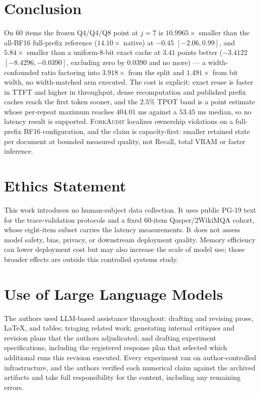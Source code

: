 \documentclass{article}
\newcommand{\method}{\textsc{ForkAudit}}
\begin{document}
\FloatBarrier

\section{Conclusion}

On 60 items the frozen Q4/Q4/Q8 point at $j=7$ is $10.9965\times$ smaller than
the all-BF16 full-prefix reference ($14.10\times$ native) at $-0.45$
$[-2.06,0.99]$, and $5.84\times$ smaller than a uniform-8-bit exact cache at
$3.41$ points better ($-3.4122$ $[-8.4296,-0.0390]$, excluding zero by $0.0390$
and no more) --- a width-confounded ratio factoring into $3.918\times$ from the
split and $1.491\times$ from bit width, no width-matched arm executed.  The cost
is explicit: exact reuse is faster in TTFT and higher in throughput, dense
recomputation and published prefix caches reach the first token sooner, and the
$2.5\%$ TPOT band is a point estimate whose per-repeat maximum reaches $404.01$
ms against a $53.45$ ms median, so no latency result is supported.  \method{}
localizes ownership violations on a full-prefix BF16 configuration, and the claim
is capacity-first: smaller retained state per document at bounded measured
quality, not Recall, total VRAM or faster inference.

\section*{Ethics Statement}
This work introduces no human-subject data collection. It uses public PG-19 text
for the trace-validation protocols and a fixed 60-item Qasper/2WikiMQA cohort,
whose eight-item subset carries the latency measurements. It does not assess
model safety, bias, privacy, or downstream deployment quality. Memory efficiency
can lower deployment cost but may also increase the scale of model use; those
broader effects are outside this controlled systems study.

\section*{Use of Large Language Models}
The authors used LLM-based assistance throughout: drafting and revising prose,
LaTeX, and tables; triaging related work; generating internal critiques and
revision plans that the authors adjudicated; and drafting experiment
specifications, including the registered response plan that selected which
additional runs this revision executed. Every experiment ran on
author-controlled infrastructure, and the authors verified each numerical claim
against the archived artifacts and take full responsibility for the content,
including any remaining errors.
\end{document}
